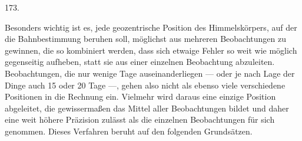 \par{}\medskip
\begin{center}\hypertarget{native-243-article173}{}173.\end{center}
Besonders wichtig ist es, jede geozentrische Position des Himmelskörpers, auf der die Bahnbestimmung beruhen soll, möglichst aus mehreren Beobachtungen zu gewinnen, die so kombiniert werden, dass sich etwaige Fehler so weit wie möglich gegenseitig aufheben, statt sie aus einer einzelnen Beobachtung abzuleiten. Beobachtungen, die nur wenige Tage auseinanderliegen --- oder je nach Lage der Dinge auch 15 oder 20 Tage ---, gehen also nicht als ebenso viele verschiedene Positionen in die Rechnung ein. Vielmehr wird daraus eine einzige Position abgeleitet, die gewissermaßen das Mittel aller Beobachtungen bildet und daher eine weit höhere Präzision zulässt als die einzelnen Beobachtungen für sich genommen. Dieses Verfahren beruht auf den folgenden Grundsätzen.

